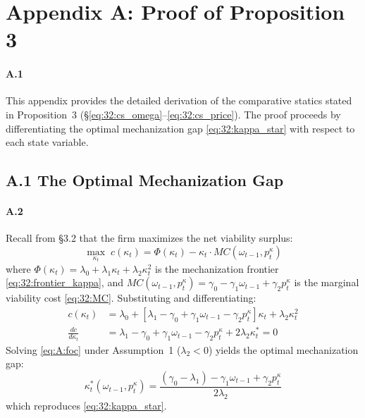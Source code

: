\appendix
\section*{Appendix A: Proof of Proposition 3}

\paragraph{A.1}
This appendix provides the detailed derivation of the
comparative statics stated in Proposition~3
(\S\ref{eq:32:cs_omega}--\ref{eq:32:cs_price}). The proof
proceeds by differentiating the optimal mechanization gap
\eqref{eq:32:kappa_star} with respect to each state
variable.

\subsection*{A.1 The Optimal Mechanization Gap}

\paragraph{A.2}
Recall from \S3.2 that the firm maximizes the net
viability surplus:
\begin{equation}
	\max_{\kappa_t}\; c(\kappa_t)
	= \Phi(\kappa_t) - \kappa_t \cdot MC(\omega_{t-1}, p^\kappa_t)
	\label{eq:A:objective}
\end{equation}
where $\Phi(\kappa_t) = \lambda_0 + \lambda_1 \kappa_t
+ \lambda_2 \kappa_t^2$ is the mechanization frontier
\eqref{eq:32:frontier_kappa}, and
$MC(\omega_{t-1}, p^\kappa_t) = \gamma_0 - \gamma_1 \omega_{t-1}
+ \gamma_2 p^\kappa_t$ is the marginal viability cost
\eqref{eq:32:MC}. Substituting and differentiating:
\begin{align}
	c(\kappa_t) &= \lambda_0
	+ \left[\lambda_1 - \gamma_0 + \gamma_1 \omega_{t-1}
	- \gamma_2 p^\kappa_t\right] \kappa_t
	+ \lambda_2 \kappa_t^2
	\label{eq:A:unconstrained} \\
	\frac{dc}{d\kappa_t} &= \lambda_1 - \gamma_0
	+ \gamma_1 \omega_{t-1} - \gamma_2 p^\kappa_t
	+ 2\lambda_2 \kappa_t^* = 0
	\label{eq:A:foc}
\end{align}
Solving \eqref{eq:A:foc} under Assumption~1
($\lambda_2 < 0$) yields the optimal mechanization gap:
\begin{equation}
	\kappa_t^*(\omega_{t-1}, p^\kappa_t)
	= \frac{(\gamma_0 - \lambda_1) - \gamma_1 \omega_{t-1}
		+ \gamma_2 p^\kappa_t}{2\lambda_2}
	\label{eq:A:kappa_star}
\end{equation}
which reproduces \eqref{eq:32:kappa_star}.

